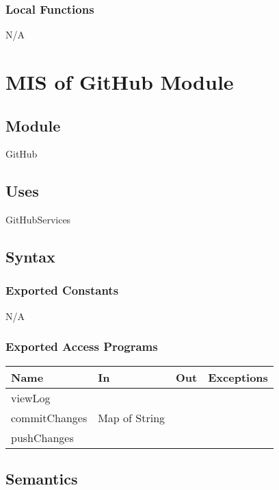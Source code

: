 \documentclass[12pt, titlepage]{article}
\begin{document}
	\subsubsection{Local Functions}
	
	N/A
	
	\newpage
	
	
	\section{MIS of GitHub Module} \label{Module} 
	
	\subsection{Module}
	GitHub
	
	\subsection{Uses}
	GitHubServices
	
	\subsection{Syntax}
	
	\subsubsection{Exported Constants}
	N/A
	
	\subsubsection{Exported Access Programs}
	
	\begin{center}
		\begin{tabular}{l  l  l  l}
			\hline
			\textbf{Name} & \textbf{In} & \textbf{Out} & \textbf{Exceptions} \\
			\hline
			viewLog & ~ & ~ & ~ \\
			\hline
			commitChanges & Map of String & ~ & ~ \\
			\hline
			pushChanges & ~ & ~ & ~ \\
			\hline
			
		\end{tabular}
	\end{center}
	
	
	\subsection{Semantics}
	
\end{document}
